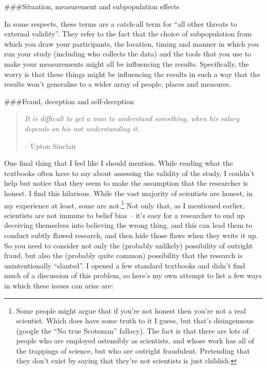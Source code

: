\documentclass[]{book}
\begin{document}
\#\#\#Situation, measurement and subpopulation effects

In some respects, these terms are a catch-all term for ``all other threats to external validity''. They refer to the fact that the choice of subpopulation from which you draw your participants, the location, timing and manner in which you run your study (including who collects the data) and the tools that you use to make your measurements might all be influencing the results. Specifically, the worry is that these things might be influencing the results in such a way that the results won't generalise to a wider array of people, places and measures.

\#\#\#Fraud, deception and self-deception

\begin{quote}
\emph{It is difficult to get a man to understand something, when his salary depends on his not understanding it.}

-- Upton Sinclair
\end{quote}

One final thing that I feel like I should mention. While reading what the textbooks often have to say about assessing the validity of the study, I couldn't help but notice that they seem to make the assumption that the researcher is honest. I find this hilarious. While the vast majority of scientists are honest, in my experience at least, some are not.\footnote{Some people might argue that if you're not honest then you're not a real scientist. Which does have some truth to it I guess, but that's disingenuous (google the ``No true Scotsman'' fallacy). The fact is that there are lots of people who are employed ostensibly as scientists, and whose work has all of the trappings of science, but who are outright fraudulent. Pretending that they don't exist by saying that they're not scientists is just childish.} Not only that, as I mentioned earlier, scientists are not immune to belief bias -- it's easy for a researcher to end up deceiving themselves into believing the wrong thing, and this can lead them to conduct subtly flawed research, and then hide those flaws when they write it up. So you need to consider not only the (probably unlikely) possibility of outright fraud, but also the (probably quite common) possibility that the research is unintentionally ``slanted''. I opened a few standard textbooks and didn't find much of a discussion of this problem, so here's my own attempt to list a few ways in which these issues can arise are:
\end{document}
